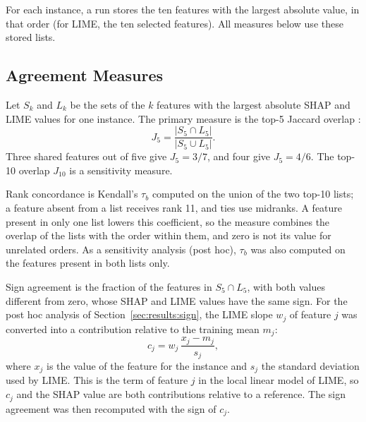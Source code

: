 \documentclass{cys}
\begin{document}
For each instance, a run stores the ten features with the largest absolute value, in
that order (for LIME, the ten selected features). All measures below use these stored
lists.

\subsection{Agreement Measures}

Let $S_k$ and $L_k$ be the sets of the $k$ features with the largest absolute SHAP and
LIME values for one instance. The primary measure is the top-5 Jaccard overlap
\cite{jaccard1912distribution}:
\begin{equation}
J_5 = \frac{|S_5 \cap L_5|}{|S_5 \cup L_5|}.
\label{eq:jaccard}
\end{equation}
Three shared features out of five give $J_5 = 3/7$, and four give $J_5 = 4/6$. The top-10 overlap $J_{10}$ is a sensitivity measure.

Rank concordance is Kendall's $\tau_b$ \cite{kendall1945treatment} computed on the union
of the two top-10 lists; a feature absent from a list receives rank 11, and ties use
midranks. A feature present in only one list lowers this coefficient, so the measure
combines the overlap of the lists with the order within them, and zero is not its value
for unrelated orders. As a sensitivity analysis (post hoc), $\tau_b$ was also computed on
the features present in both lists only.

Sign agreement is the fraction of the features in $S_5 \cap L_5$, with both values
different from zero, whose SHAP and LIME values have the same sign. For the post hoc
analysis of Section~\ref{sec:results:sign}, the LIME slope $w_j$ of feature $j$ was
converted into a contribution relative to the training mean $m_j$:
\begin{equation}
c_j = w_j \, \frac{x_j - m_j}{s_j},
\label{eq:contribution}
\end{equation}
where $x_j$ is the value of the feature for the instance and $s_j$ the standard deviation
used by LIME. This is the term of feature $j$ in the local linear model of LIME, so
$c_j$ and the SHAP value are both contributions relative to a reference. The sign
agreement was then recomputed with the sign of $c_j$.
\end{document}
